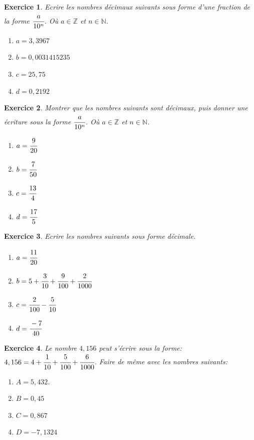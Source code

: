 \documentclass[10pt,a4paper]{article}
\newcommand{\N}{\mathbb{N}}
\newcommand{\Z}{\mathbb{Z}}
\newtheorem{exo}{Exercice}
\begin{document}
\begin{exo}
  Ecrire les nombres décimaux suivants sous forme d'une fraction de la forme 
  $\cfrac{a}{10^{n}}$. Où $a\in\Z$ et $n\in\N$.
  \begin{enumerate}
    \item $a=3,3967$
    \item $b=0,0031415235$
    \item $c=25,75$
    \item $d=0,2192$
  \end{enumerate}
\end{exo}

\begin{exo}
  Montrer que les nombres suivants sont décimaux, puis donner une écriture sous la forme 
  $\cfrac{a}{10^{n}}$. Où $a\in\Z$ et $n\in\N$.
  \begin{enumerate}
    \item $a=\cfrac{9}{20}$
    \item $b=\cfrac{7}{50}$
    \item $c=\cfrac{13}{4}$
    \item $d=\cfrac{17}{5}$
  \end{enumerate}
\end{exo}

\begin{exo}
  Ecrire les nombres suivants sous forme décimale.
  \begin{enumerate}
    \item $a=\cfrac{11}{20}$
    \item $b=5+\cfrac{3}{10}+\cfrac{9}{100}+\cfrac{2}{1000}$
    \item $c=\cfrac{2}{100}-\cfrac{5}{10}$
    \item $d=\cfrac{-7}{40}$
  \end{enumerate}
\end{exo}

\begin{exo}
Le nombre $4,156$ peut s'écrire sous la forme: $4,156=4+\cfrac{1}{10}+\cfrac{5}{100}+\cfrac{6}{1000}$. Faire de même avec les nombres suivants:
\begin{enumerate}
\item $A=5,432$.
\item $B=0,45$
\item $C=0,867$
\item $D=-7,1324$	
\end{enumerate}
	
\end{exo}
\end{document}
